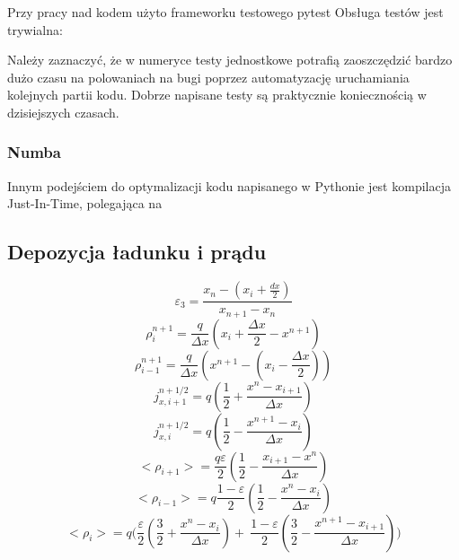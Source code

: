 Przy pracy nad kodem użyto frameworku testowego pytest %
Obsługa testów jest trywialna:

Należy zaznaczyć, że w numeryce testy jednostkowe potrafią zaoszczędzić bardzo dużo czasu na polowaniach na bugi
poprzez automatyzację uruchamiania kolejnych partii kodu. Dobrze napisane testy są praktycznie koniecznością w dzisiejszych
czasach. %

\subsubsection{Numba}

Innym podejściem do optymalizacji kodu napisanego w Pythonie jest kompilacja Just-In-Time, polegająca na %



\subsection{Depozycja ładunku i prądu}

\begin{equation}
    \varepsilon_3 = \frac{x_n - (x_i + \frac{dx}{2})}{x_{n+1} - x_n}
\end{equation}
\begin{equation}
    \rho_i^{n+1} = \frac{q}{\Delta x} (x_i + \frac{\Delta x}{2} - x^{n+1})
\end{equation}
\begin{equation}
    \rho_{i-1}^{n+1} = \frac{q}{\Delta x} (x^{n+1} - (x_i - \frac{\Delta x}{2}))
\end{equation}
\begin{equation}
    j_{x,i+1}^{n+1/2} = q (\frac{1}{2} + \frac{x^n - x_{i+1}}{\Delta x})
\end{equation}
\begin{equation}
    j_{x,i}^{n+1/2} = q (\frac{1}{2} - \frac{x^{n+1} - x_i}{\Delta x})
\end{equation}
\begin{equation}
    <\rho_{i+1}> = \frac{q \varepsilon}{2} (\frac{1}{2} - \frac{x_{i+1} - x^n}{\Delta x})
\end{equation}
\begin{equation}
    <\rho_{i-1}> = q \frac{1- \varepsilon}{2} (\frac{1}{2} - \frac{x^n - x_i}{\Delta x})
\end{equation}
\begin{equation}
    <\rho_{i}> = q \Bigg(\frac{\varepsilon}{2} (\frac{3}{2} + \frac{x^n-x_i}{\Delta x}) +\
    \frac{1-\varepsilon}{2} (\frac{3}{2} - \frac{x^{n+1} - x_{i+1}}{\Delta x})\Bigg)
\end{equation}

